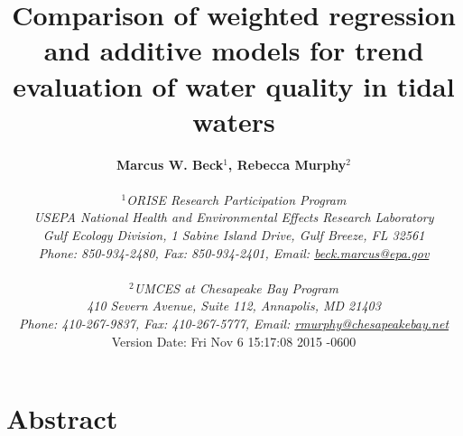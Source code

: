 \documentclass[letterpaper,12pt,oneside]{article}\usepackage[]{graphicx}\usepackage[]{color}
\begin{document}
\raggedbottom
\linenumbers
\raggedright
{}
\setlength{\parindent}{0.5in}
\renewcommand\refname{References \vspace{12pt}}

\begin{singlespace}
\title{{\bf {\Large Comparison of weighted regression and additive models for trend evaluation of water quality in tidal waters}}}
\author{
  {\bf {\normalsize Marcus W. Beck$^1$, Rebecca Murphy$^2$}}
  \\\\{\textit {\normalsize $^1$ORISE Research Participation Program}}
  \\{\textit {\normalsize USEPA National Health and Environmental Effects Research Laboratory}}
  \\{\textit {\normalsize Gulf Ecology Division, 1 Sabine Island Drive, Gulf Breeze, FL 32561}}
	\\{\textit {\normalsize Phone: 850-934-2480, Fax: 850-934-2401, Email: \href{mailto:beck.marcus@epa.gov}{beck.marcus@epa.gov}}}
  \\\\{\textit {\normalsize $^2$UMCES at Chesapeake Bay Program}}
	\\{\textit {\normalsize 410 Severn Avenue, Suite 112, Annapolis, MD 21403}}
	\\{\textit {\normalsize Phone: 410-267-9837, Fax: 410-267-5777, Email: \href{mailto:rmurphy@chesapeakbay.net}{rmurphy@chesapeakebay.net}}}
  \vspace{1in} 
  \\ Version Date:   Fri Nov 6 15:17:08 2015 -0600
	}
\date{}
\maketitle
\end{singlespace}
\clearpage

\section*{Abstract}
\end{document}

